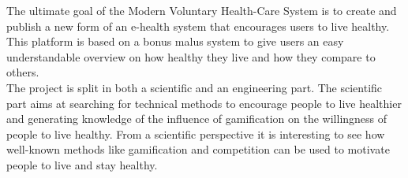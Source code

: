 \documentclass[a4paper,11pt]{article}
\providecommand*{\note}[1]{\small \textcolor{RoyalBlue}{\begin{minipage}{\textwidth}{#1}\end{minipage}}}
\begin{document}

The ultimate goal of the Modern Voluntary Health-Care System is to create and publish a new form of an e-health system that encourages users to live healthy. This platform is based on a bonus malus system to give users an easy understandable overview on how healthy they live and how they compare to others. \\

The project is split in both a scientific and an engineering part. The scientific part aims at searching for technical methods to encourage people to live healthier and generating knowledge of the influence of gamification on the willingness of people to live healthy. From a scientific perspective it is interesting to see how well-known methods like gamification and competition can be used to motivate people to live and stay healthy.
\end{document}

